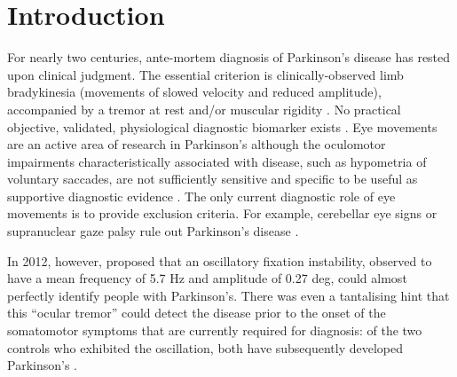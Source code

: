 \documentclass[jou,a4paper]{apa6}
\begin{document}
\begin{figure}[!b]
\end{figure}

\section{Introduction}

For nearly two centuries, ante-mortem diagnosis of Parkinson's disease has rested upon clinical judgment. The essential criterion is clinically-observed limb bradykinesia (movements of slowed velocity and reduced amplitude), accompanied by a tremor at rest and/or muscular rigidity \citep{Postuma2015MDS-clinical-di}. No practical objective, validated, physiological diagnostic biomarker exists \citep{Sharma2013Biomarkers-in-P}. Eye movements are an active area of research in  Parkinson's \citep{MacAskill2016Eye-movements-i} although the oculomotor impairments characteristically associated with disease, such as hypometria of voluntary saccades, are not sufficiently sensitive and specific to be useful as supportive diagnostic evidence \citep{Kimmig2002What-is-patholo,Anderson2013Eye-movements-i}. The only current diagnostic role of eye movements is to provide exclusion criteria. For example, cerebellar eye signs or supranuclear gaze palsy rule out Parkinson's disease \citep{Postuma2015MDS-clinical-di,Hughes1992Accuracy-of-cli}. 

In 2012, however, \citeauthor{Gitchel2012Pervasive-ocula} proposed that an oscillatory fixation instability, observed to have a mean frequency of 5.7 Hz and amplitude of 0.27 deg, could almost perfectly identify people with Parkinson's. There was even a tantalising hint that this ``ocular tremor'' could detect the disease prior to the onset of the somatomotor symptoms that are currently required for diagnosis: of the two controls who exhibited the oscillation, both have subsequently developed Parkinson's \citep{Gitchel2014Experimental-su}.
\end{document}
